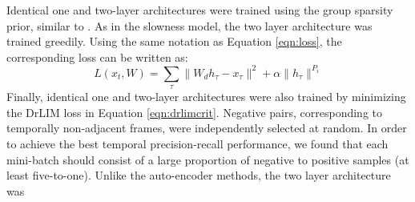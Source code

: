 Identical one and two-layer architectures were trained using the group sparsity
prior, similar to \cite{groupSparsity}. As in the slowness model, the two layer
architecture was trained greedily. Using the same notation as Equation
\ref{eqn:loss}, the corresponding loss can be written as:  \begin{equation}
L(x_t,W)= \sum_{\tau} \|W_d h_\tau - x_\tau\|^2 +\alpha \|h_\tau \|^{P_i}
\label{eqn:groupL1} \end{equation} Finally, identical one and two-layer
architectures were also trained by minimizing the DrLIM loss in Equation
\ref{eqn:drlimcrit}. Negative pairs, corresponding to temporally non-adjacent
frames, were independently selected at random. In order to achieve the best
temporal precision-recall performance, we found that each mini-batch should
consist of a large proportion of negative to positive samples (at least
five-to-one). Unlike the auto-encoder methods, the two layer architecture was
